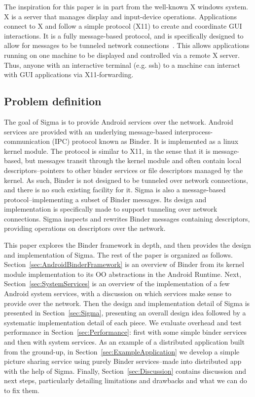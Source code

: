 \documentclass[prodmode]{acmlarge}
\begin{document}
The inspiration for this paper is in part from the well-known X windows system. X is a server that manages display and input-device operations. Applications connect to X and follow a simple protocol (X11) to create and coordinate GUI interactions. It is a fully message-based protocol, and is specifically designed to allow for messages to be tunneled network connections~\cite{X11}. This allows applications running on one machine to be displayed and controlled via a remote X server. Thus, anyone with an interactive terminal (e.g. ssh) to a machine can interact with GUI applications via X11-forwarding.

\subsection{Problem definition}

The goal of Sigma is to provide Android services over the network. Android services are provided with an underlying message-based interprocess-communication (IPC) protocol known as Binder. It is implemented as a linux kernel module. The protocol is similar to X11, in the sense that it is message-based, but messages transit through the kernel module and often contain local descriptors--pointers to other binder services or file descriptors managed by the kernel. As such, Binder is not designed to be tunneled over network connections, and there is no such existing facility for it. Sigma is also a message-based protocol--implementing a subset of Binder messages. Its design and implementation is specifically made to support tunneling over network connections. Sigma inspects and rewrites Binder messages containing descriptors, providing operations on descriptors over the network.

This paper explores the Binder framework in depth, and then provides the design and implementation of Sigma. The rest of the paper is organized as follows. Section~\ref{sec:AndroidBinderFramework} is an overview of Binder from its kernel module implementation to its OO abstractions in the Android Runtime. Next, Section~\ref{sec:SystemServices} is an overview of the implementation of a few Android system services, with a discussion on which services make sense to provide over the network. Then the design and implementation detail of Sigma is presented in Section~\ref{sec:Sigma}, presenting an overall design idea followed by a systematic implementation detail of each piece. We evaluate overhead and test performance in Section~\ref{sec:Performance}: first with some simple binder services and then with system services. As an example of a distributed application built from the ground-up, in Section~\ref{sec:ExampleApplication} we develop a simple picture sharing service using purely Binder services--made into distributed app with the help of Sigma. Finally, Section~\ref{sec:Discussion} contains discussion and next steps, particularly detailing limitations and drawbacks and what we can do to fix them.
\end{document}
